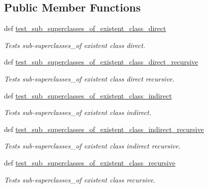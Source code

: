 \subsection*{Public Member Functions}
\begin{DoxyCompactItemize}
\item 
def \hyperlink{classsub__super__class__functional__tests_1_1OntologyFunc_a2c2269abc7334310c2033b85578563e3}{test\-\_\-sub\-\_\-superclasses\-\_\-of\-\_\-existent\-\_\-class\-\_\-direct}
\begin{DoxyCompactList}\small\item\em Tests sub-\/superclasses\-\_\-of existent class direct. \end{DoxyCompactList}\item 
def \hyperlink{classsub__super__class__functional__tests_1_1OntologyFunc_a9a68fde90b065a7ba950ff5566bbbcef}{test\-\_\-sub\-\_\-superclasses\-\_\-of\-\_\-existent\-\_\-class\-\_\-direct\-\_\-recursive}
\begin{DoxyCompactList}\small\item\em Tests sub-\/superclasses\-\_\-of existent class direct recursive. \end{DoxyCompactList}\item 
def \hyperlink{classsub__super__class__functional__tests_1_1OntologyFunc_a243cbc54adbf86cd3930aed9f4806dd4}{test\-\_\-sub\-\_\-superclasses\-\_\-of\-\_\-existent\-\_\-class\-\_\-indirect}
\begin{DoxyCompactList}\small\item\em Tests sub-\/superclasses\-\_\-of existent class indirect. \end{DoxyCompactList}\item 
def \hyperlink{classsub__super__class__functional__tests_1_1OntologyFunc_af62808d35d297753738a0d52ac0ffeb8}{test\-\_\-sub\-\_\-superclasses\-\_\-of\-\_\-existent\-\_\-class\-\_\-indirect\-\_\-recursive}
\begin{DoxyCompactList}\small\item\em Tests sub-\/superclasses\-\_\-of existent class indirect recursive. \end{DoxyCompactList}\item 
def \hyperlink{classsub__super__class__functional__tests_1_1OntologyFunc_a7e51e371afc2b76de676b15413659e18}{test\-\_\-sub\-\_\-superclasses\-\_\-of\-\_\-existent\-\_\-class\-\_\-recursive}
\begin{DoxyCompactList}\small\item\em Tests sub-\/superclasses\-\_\-of existent class recursive. \end{DoxyCompactList}\item 

\end{DoxyCompactItemize}
